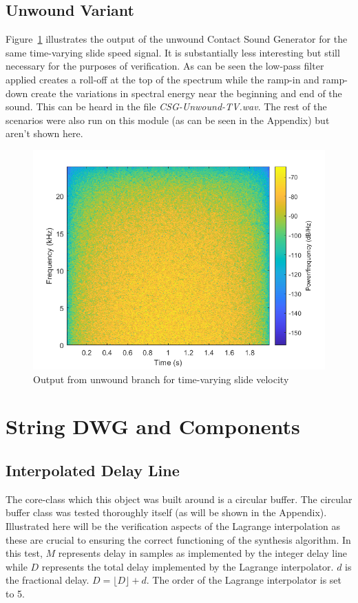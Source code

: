 \documentclass[../main.tex]{subfiles}
\begin{document}
\clearpage

\subsection{Unwound Variant}
Figure~\ref{fig:CSGUnwoundTVSpec} illustrates the output of the unwound Contact Sound Generator for the same time-varying slide speed signal. It is substantially less interesting but still necessary for the purposes of verification. As can be seen the low-pass filter applied creates a roll-off at the top of the spectrum while the ramp-in and ramp-down create the variations in spectral energy near the beginning and end of the sound. This can be heard in the file \emph{CSG-Unwound-TV.wav}. The rest of the scenarios were also run on this module (as can be seen in the Appendix) but aren't shown here.

\begin{figure}[h]
    \centering
    \includegraphics[scale=.65]{./images/plots/CSG_Unwound_TV.png}
    \caption{Output from unwound branch for time-varying slide velocity}
    \label{fig:CSGUnwoundTVSpec}
\end{figure}

\section{String DWG and Components}

\subsection{Interpolated Delay Line}
The core-class which this object was built around is a circular buffer. The circular buffer class was tested thoroughly itself (as will be shown in the Appendix). Illustrated here will be the verification aspects of the Lagrange interpolation as these are crucial to ensuring the correct functioning of the synthesis algorithm. In this test, $M$ represents delay in samples as implemented by the integer delay line while $D$ represents the total delay implemented by the Lagrange interpolator. $d$ is the fractional delay. $D = \lfloor D \rfloor + d$. The order of the Lagrange interpolator is set to 5.
\end{document}
